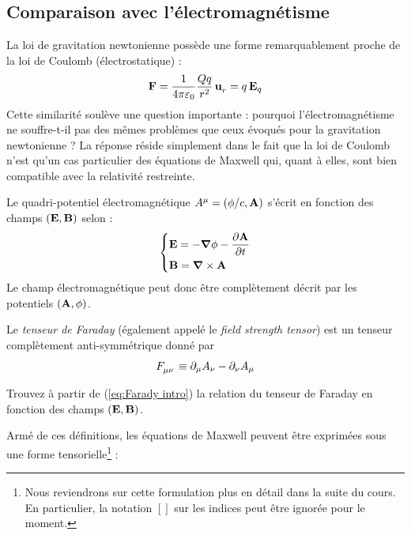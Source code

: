 \subsection{Comparaison avec l'électromagnétisme}
La loi de gravitation newtonienne possède une forme remarquablement proche de la loi de Coulomb (électrostatique) :
\begin{align}
    \vect{F} = \frac{1}{4\pi \varepsilon_0} \frac{Q q}{r^2} \,\vect{u}\indices{_r} = q \,\vect{E}_q
\end{align}
Cette similarité soulève une question importante : pourquoi l'électromagnétisme ne souffre-t-il pas des mêmes problèmes que ceux évoqués pour la gravitation newtonienne ? La réponse réside simplement dans le fait que  la loi de Coulomb n'est qu'un cas particulier des équations de Maxwell qui, quant à elles, sont bien compatible avec la relativité restreinte. 
\begin{rap}
    Le quadri-potentiel électromagnétique $A^\mu = (\phi/c,\bm{\mathrm{A}})$ s'écrit en fonction des champs $(\bm{\mathrm{E}},\bm{\mathrm{B}})$ selon :
    \begin{align}
        \begin{dcases}
            \bm{\mathrm{E}} = - \bm{\mathrm{\nabla}} \phi - \frac{\partial \bm{\mathrm{A}}}{\partial t} \\
            \bm{\mathrm{B}} = \bm{\mathrm{\nabla}} \times \bm{\mathrm{A}}
        \end{dcases}
    \end{align}
    Le champ électromagnétique peut donc être complètement décrit par les potentiels $(\bm{\mathrm{A}},\phi)$. 
\end{rap}
\begin{rap}
    Le \emph{tenseur de Faraday} (également appelé le \emph{field strength tensor}) est un tenseur complètement anti-symmétrique donné par
    \begin{equation}
    \label{eq:Farady intro}
        F\indices{_\mu_\nu} \deq \pd_\mu A_\nu - \pd_\nu A_\mu
    \end{equation}
\end{rap}
\begin{exerc}
    Trouvez à partir de (\ref{eq:Farady intro}) la relation du tenseur de Faraday en fonction des champs $(\bm{\mathrm{E}},\bm{\mathrm{B}})$.
\end{exerc}
\cutebreak
Armé de ces définitions, les équations de Maxwell peuvent être exprimées sous une forme tensorielle\footnote{Nous reviendrons sur cette formulation plus en détail dans la suite du cours. En particulier, la notation $[]$ sur les indices peut être ignorée pour le moment.} :
